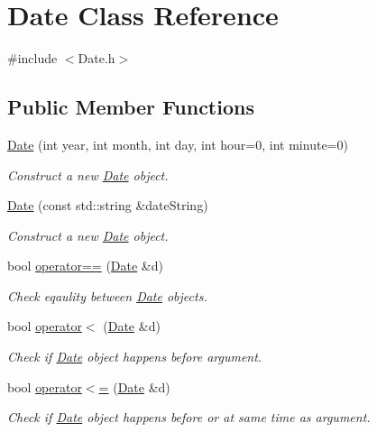 \hypertarget{classDate}{}\section{Date Class Reference}
\label{classDate}


{\ttfamily \#include $<$Date.\+h$>$}

\subsection*{Public Member Functions}
\begin{DoxyCompactItemize}
\item 
\mbox{\hyperlink{classDate_aa29ee0f04162437b91b758be0a4b75fc}{Date}} (int year, int month, int day, int hour=0, int minute=0)
\begin{DoxyCompactList}\small\item\em Construct a new \mbox{\hyperlink{classDate}{Date}} object. \end{DoxyCompactList}\item 
\mbox{\hyperlink{classDate_abaa8b0cf93eb1ad9206be4ff78ed2a3b}{Date}} (const std\+::string \&date\+String)
\begin{DoxyCompactList}\small\item\em Construct a new \mbox{\hyperlink{classDate}{Date}} object. \end{DoxyCompactList}\item 
bool \mbox{\hyperlink{classDate_a91ccc0361527f5f68785c5460d750a12}{operator==}} (\mbox{\hyperlink{classDate}{Date}} \&d)
\begin{DoxyCompactList}\small\item\em Check eqaulity between \mbox{\hyperlink{classDate}{Date}} objects. \end{DoxyCompactList}\item 
bool \mbox{\hyperlink{classDate_a51d1dadde23783adc9a2ae12d877803c}{operator$<$}} (\mbox{\hyperlink{classDate}{Date}} \&d)
\begin{DoxyCompactList}\small\item\em Check if \mbox{\hyperlink{classDate}{Date}} object happens before argument. \end{DoxyCompactList}\item 
bool \mbox{\hyperlink{classDate_a49b4e0ed6752c928164fd483720423da}{operator$<$=}} (\mbox{\hyperlink{classDate}{Date}} \&d)
\begin{DoxyCompactList}\small\item\em Check if \mbox{\hyperlink{classDate}{Date}} object happens before or at same time as argument. \end{DoxyCompactList}\item 

\end{DoxyCompactItemize}
